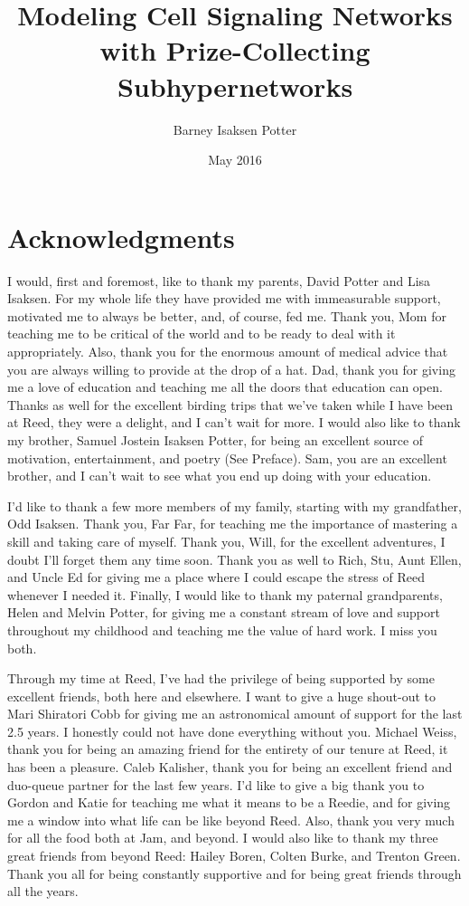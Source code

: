 \documentclass[12pt,twoside]{reedthesis}
\title{Modeling Cell Signaling Networks with Prize-Collecting Subhypernetworks}
\author{Barney Isaksen Potter}
\date{May 2016}
\theoremstyle{definition}
\begin{document}
  \maketitle
  \frontmatter %
  \pagestyle{empty} %

    \chapter*{Acknowledgments}
	I would, first and foremost, like to thank my parents, David Potter and Lisa Isaksen. For my whole life they have provided me with immeasurable support, motivated me to always be better, and, of course, fed me. Thank you, Mom  for teaching me to be critical of the world and to be ready to deal with it appropriately. Also, thank you for the enormous amount of medical advice that you are always willing to provide at the drop of a hat. Dad, thank you for giving me a love of education and teaching me all the doors that education can open. Thanks as well for the excellent birding trips that we've taken while I have been at Reed, they were a delight, and I can't wait for more. I would also like to thank my brother, Samuel Jostein Isaksen Potter, for being an excellent source of motivation, entertainment, and poetry (See Preface). Sam, you are an excellent brother, and I can't wait to see what you end up doing with your education.\par
  I'd like to thank a few more members of my family, starting with my grandfather, Odd Isaksen. Thank you, Far Far, for teaching me the importance of mastering a skill and taking care of myself. Thank you, Will, for the excellent adventures, I doubt I'll forget them any time soon. Thank you as well to Rich, Stu, Aunt Ellen, and Uncle Ed for giving me a place where I could escape the stress of Reed whenever I needed it. Finally, I would like to thank my paternal grandparents, Helen and Melvin Potter, for giving me a constant stream of love and support throughout my childhood and teaching me the value of hard work. I miss you both. \par
  Through my time at Reed, I've had the privilege of being supported by some excellent friends, both here and elsewhere. I want to give a huge shout-out to Mari Shiratori Cobb for giving me an astronomical amount of support for the last 2.5 years. I honestly could not have done everything without you. Michael Weiss, thank you for being an amazing friend for the entirety of our tenure at Reed, it has been a pleasure. Caleb Kalisher, thank you for being an excellent friend and duo-queue partner for the last few years. I'd like to give a big thank you to Gordon and Katie for teaching me what it means to be a Reedie, and for giving me a window into what life can be like beyond Reed. Also, thank you very much for all the food both at Jam, and beyond. I would also like to thank my three great friends from beyond Reed: Hailey Boren, Colten Burke, and Trenton Green. Thank you all for being constantly supportive and for being great friends through all the years.\par
\end{document}
